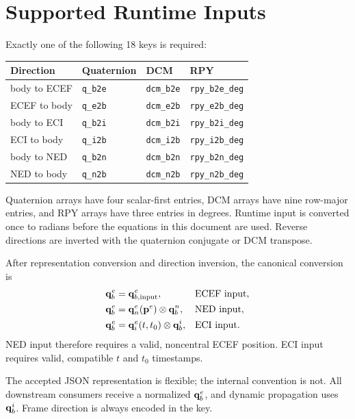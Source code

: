 \section{Supported Runtime Inputs}

Exactly one of the following 18 keys is required:

\begin{center}
\small
\begin{tabular}{llll}
\toprule
Direction & Quaternion & DCM & RPY \\
\midrule
body to ECEF &
\texttt{q\_b2e} & \texttt{dcm\_b2e} & \texttt{rpy\_b2e\_deg} \\
ECEF to body &
\texttt{q\_e2b} & \texttt{dcm\_e2b} & \texttt{rpy\_e2b\_deg} \\
body to ECI &
\texttt{q\_b2i} & \texttt{dcm\_b2i} & \texttt{rpy\_b2i\_deg} \\
ECI to body &
\texttt{q\_i2b} & \texttt{dcm\_i2b} & \texttt{rpy\_i2b\_deg} \\
body to NED &
\texttt{q\_b2n} & \texttt{dcm\_b2n} & \texttt{rpy\_b2n\_deg} \\
NED to body &
\texttt{q\_n2b} & \texttt{dcm\_n2b} & \texttt{rpy\_n2b\_deg} \\
\bottomrule
\end{tabular}
\end{center}

Quaternion arrays have four scalar-first entries, DCM arrays have nine
row-major entries, and RPY arrays have three entries in degrees. Runtime input
is converted once to radians before the equations in this document are used. Reverse
directions are inverted with the quaternion conjugate or DCM transpose.

After representation conversion and direction inversion, the canonical
conversion is
\begin{align}
\mathbf{q}_b^e
&=\mathbf{q}_{b,\mathrm{input}}^e,
&&\text{ECEF input},\\
\mathbf{q}_b^e
&=\mathbf{q}_n^e(\mathbf{p}^{e})\otimes\mathbf{q}_b^n,
&&\text{NED input},\\
\mathbf{q}_b^e
&=\mathbf{q}_i^e(t,t_0)\otimes\mathbf{q}_b^i,
&&\text{ECI input}.
\label{eq:attitude_input_conversion}
\end{align}
NED input therefore requires a valid, noncentral ECEF position. ECI input
requires valid, compatible $t$ and $t_0$ timestamps.

\begin{warningbox}
The accepted JSON representation is flexible; the internal convention is not.
All downstream consumers receive a normalized $\mathbf{q}_b^e$, and dynamic
propagation uses $\mathbf{q}_b^i$. Frame direction is always encoded in the key.
\end{warningbox}
